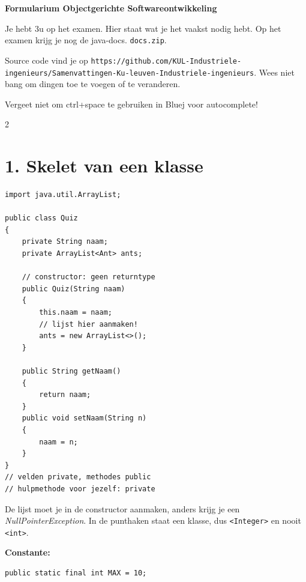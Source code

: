 \documentclass[12pt,a4paper]{extarticle}
\begin{document}
\begin{center}
    {\Large\bfseries Formularium Objectgerichte Softwareontwikkeling}\\[0.5mm]
    {\small Je hebt 3u op het examen. Hier staat wat je het vaakst nodig
    hebt. Op het examen krijg je nog de java-docs.
    \texttt{docs.zip}.

    Source code vind je op \texttt{https://github.com/KUL-Industriele-ingenieurs/Samenvattingen-Ku-leuven-Industriele-ingenieurs}. Wees niet bang om
    dingen toe te voegen of te veranderen.}

    Vergeet niet om ctrl+space te gebruiken in Bluej voor autocomplete!
\end{center}
\vspace{1mm}

\begin{multicols}{2}

    \section{1. Skelet van een klasse}
    \begin{lstlisting}
import java.util.ArrayList;

public class Quiz
{
    private String naam;
    private ArrayList<Ant> ants;

    // constructor: geen returntype
    public Quiz(String naam)
    {
        this.naam = naam;
        // lijst hier aanmaken!
        ants = new ArrayList<>();
    }

    public String getNaam()
    {
        return naam;
    }
    public void setNaam(String n)
    {
        naam = n;
    }
}
// velden private, methodes public
// hulpmethode voor jezelf: private
\end{lstlisting}
    De lijst moet je in de constructor aanmaken, anders krijg je een
    \emph{NullPointerException}. In de punthaken staat een klasse, dus
    \texttt{<Integer>} en nooit \texttt{<int>}.

    \textbf{Constante:}
    \begin{lstlisting}
public static final int MAX = 10;
\end{lstlisting}


\end{multicols}
\end{document}
